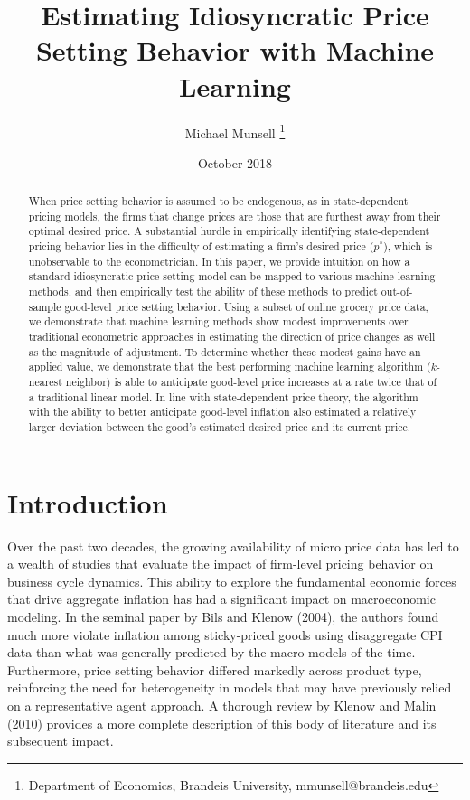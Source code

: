 \documentclass[11pt]{article}
\title{Estimating Idiosyncratic Price Setting Behavior with Machine Learning}
\author{Michael Munsell \footnote{Department of Economics, Brandeis University, mmunsell@brandeis.edu}}
\date{October 2018}
\begin{document}
\maketitle

\onehalfspacing
\setlength{\parindent}{2em}

\begin{abstract}
When price  setting  behavior  is  assumed  to  be  endogenous, as  in  state-dependent pricing models,  the  firms  that  change  prices  are  those  that  are  furthest  away  from  their  optimal desired  price. A substantial hurdle in empirically identifying state-dependent pricing behavior lies in the difficulty of estimating a firm's desired price ($p^*$), which is unobservable to the econometrician. In this paper, we provide intuition on how a standard idiosyncratic price setting model can be mapped to various machine learning methods, and then empirically test the ability of these methods to predict out-of-sample good-level price setting behavior. Using a subset of online grocery price data, we demonstrate that machine learning methods show modest improvements over traditional econometric approaches in estimating the direction of price changes as well as the magnitude of adjustment. To determine whether these modest gains have an applied value, we demonstrate that the best performing machine learning algorithm ($k$-nearest neighbor) is able to anticipate good-level price increases at a rate twice that of a traditional linear model. In line with state-dependent price theory, the algorithm with the ability to better anticipate good-level inflation also estimated a relatively larger deviation between the good's estimated desired price and its current price.
\end{abstract}



\vspace{4cm}


\pagebreak{}
\doublespacing


\section{Introduction}
Over the past two decades, the growing availability of micro price data has led to a wealth of studies that evaluate the impact of firm-level pricing behavior on business cycle dynamics. This ability to explore the fundamental economic forces that drive aggregate inflation has had a significant impact on macroeconomic modeling. In the seminal paper by Bils and Klenow (2004), the authors found much more violate inflation among sticky-priced goods using disaggregate CPI data than what was generally predicted by the macro models of the time. Furthermore, price setting behavior differed markedly across product type, reinforcing the need for heterogeneity in models that may have previously relied on a representative agent approach. A thorough review by Klenow and Malin (2010) provides a more complete description of this body of literature and its subsequent impact. 
\end{document}
